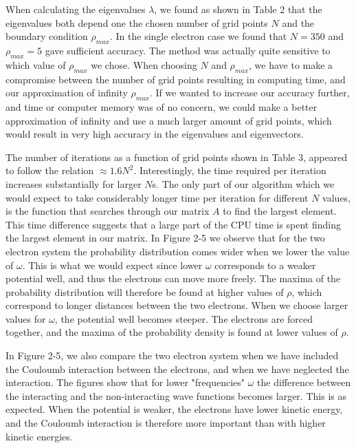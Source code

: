 \documentclass[norsk,a4paper,12pt]{article}
\begin{document}
When calculating the eigenvalues $\lambda$, we found as shown in Table 2 that the eigenvalues both depend one the chosen number of grid points $N$ and the boundary condition $\rho_{max}$. In the single electron case we found that $N=350$ and $\rho_{max} = 5$ gave sufficient accuracy. The method was actually quite sensitive to which value of $\rho_{max}$ we chose. When choosing $N$ and $\rho_{max}$, we have to make a compromise between the number of grid points resulting in computing time, and our approximation of infinity $\rho_{max}$. If we wanted to increase our accuracy further, and time or computer memory was of no concern, we could make a better approximation of infinity and use a much larger amount of grid points, which would result in very high accuracy in the eigenvalues and eigenvectors.

The number of iterations as a function of grid points shown in Table 3, appeared to follow the relation $\approx 1.6 N^2$. Interestingly, the time required per iteration increases substantially for larger $N$s. The only part of our algorithm which we would expect to take considerably longer time per iteration for different $N$ values, is the function that searches through our matrix $A$ to find the largest element. This time difference suggests that a large part of the CPU time is spent finding the largest element in our matrix. 
\vspace{1mm}
In Figure 2-5 we observe that for the two electron system the probability distribution comes wider when we lower the value of $\omega$. This is what we would expect since lower $\omega$ corresponds to a weaker potential well, and thus the electrons can move more freely. The maxima of the probability distribution will therefore be found at higher values of $\rho$, which correspond to longer distances between the two electrons. When we choose larger values for $\omega$, the potential well becomes steeper. The electrons are forced together, and the maxima of the probability density is found at lower values of $\rho$.
\par
\vspace{2mm}
In Figure 2-5, we also compare the two electron system when we have included the Couloumb interaction between the electrons, and when we have neglected the interaction. The figures show that for lower "frequencies" $\omega$ the difference between the interacting and the non-interacting wave functions becomes larger. This is as expected. When the potential is weaker, the electrons have lower kinetic energy, and the Couloumb interaction is therefore more important than with higher kinetic energies.
\par
\vspace{3mm}
\end{document}
